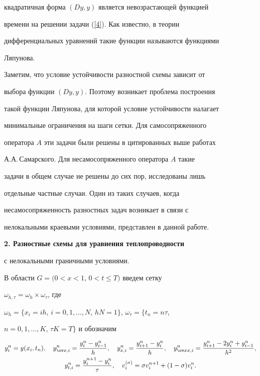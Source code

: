 квадратичная форма $(Dy,y)$ является невозрастающей функцией


времени на решении задачи (\ref{4}). Как известно, в теории


дифференциальных уравнений такие функции называются функциями


Ляпунова.





Заметим, что условие устойчивости разностной схемы зависит от


выбора функции $(Dy,y)$. Поэтому возникает проблема построения


такой функции Ляпунова, для которой условие устойчивости налагает


минимальные ограничения на шаги сетки. Для самосопряженного


оператора $A$ эти задачи были решены в цитированных выше работах


А.А.\,Самарского. Для несамосопряженного оператора $A$ такие


задачи в общем случае не решены до сих пор, исследованы лишь


отдельные частные случаи. Один из таких случаев, когда


несамосопряженность разностных задач возникает в связи с


нелокальными краевыми условиями, представлен в данной работе.


\medskip





{\bf 2. Разностные схемы для уравнения теплопроводности


с нелокальными граничными условиями.}


В области $G=(0 < x < 1$, $0 < t \leqslant T)$ введем сетку


$\omega_{h,\tau}=\omega_h \times \omega_\tau $, где 


$\omega_h=\{x_i=ih$, $i=0,1,\dotsc,N$, $hN=


1\}$, $ \omega_\tau=\{t_n=n\tau$,


$n=0,1,\dotsc,K$, $\tau K=T\}$ и обозначим


\begin{gather*}


y_i^n=y(x_i,t_n),\quad y_{\ov x,i}^n=\frac{{y_i^n-y_{i


- 1}^n}} {h},\quad y_{x,i}^n=\frac{{y_{i+1}^n-y_i^n}}


{h},\quad y_{\ov xx,i}^n=\frac{{y_{i+1}^n-2y_i^n+y_{i


- 1}^n}} {h^{2}}, \\


%


y_{t,i}^n=\frac{{y_i^{n+1}-y_i^n}} {\tau},\quad


v_i^{(\sigma)}=\sigma v_i^{n+1}+(1-\sigma)v_i^n .


\end{gather*}


